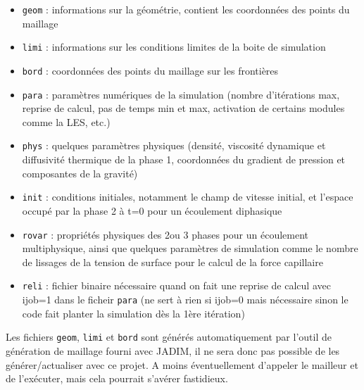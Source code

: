 \documentclass{article} %
\newcommand{\code}[1]{\colorbox{light-gray}{\texttt{#1}}}
\begin{document}
\begin{itemize}
    \item   \code{geom} : informations sur la géométrie, contient les coordonnées des points du maillage
    \item   \code{limi} : informations sur les conditions limites de la boite de simulation
    \item   \code{bord} : coordonnées des points du maillage sur les frontières
    \item   \code{para} : paramètres numériques de la simulation (nombre d'itérations max, reprise de calcul, pas de temps min et max, activation de certains modules comme la LES, etc.)
    \item   \code{phys} : quelques paramètres physiques (densité, viscosité dynamique et diffusivité thermique de la phase 1, coordonnées du gradient de pression et composantes de la gravité)
    \item   \code{init} : conditions initiales, notamment le champ de vitesse initial, et l'espace occupé par la phase 2 à t=0 pour un écoulement diphasique
    \item   \code{rovar} : propriétés physiques des 2ou 3 phases pour un écoulement multiphysique, ainsi que quelques paramètres de simulation comme le nombre de lissages de la tension de surface pour le calcul de la force capillaire
    \item   \code{reli} : fichier binaire nécessaire quand on fait une reprise de calcul avec ijob=1 dans le ficheir \code{para} (ne sert à rien si ijob=0 mais nécessaire sinon le code fait planter la simulation dès la 1ère itération)
\end{itemize}

Les fichiers \code{geom}, \code{limi} et \code{bord} sont générés automatiquement par l'outil de génération de maillage fourni avec JADIM, il ne sera donc pas possible de les générer/actualiser avec ce projet. A moins éventuellement d'appeler le mailleur et de l'exécuter, mais cela pourrait s'avérer fastidieux.
\end{document}
